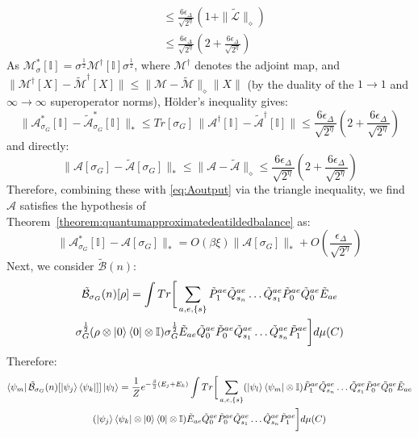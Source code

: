 \documentclass[aps,floatfix,10pt,amssymb,amsfont,amsmath,superscriptaddress,float,nofootinbib,longbibliography,nobalancelastpage,twocolumn]{revtex4-2}
\begin{document}
\begin{widetext}
\begin{align}
    &\leq \frac{6\epsilon_{\Delta}}{\sqrt{2^{\eta}}}(1+\|\tilde{\mathcal{L}}\|_{\diamond})\\
    &\leq \frac{6\epsilon_{\Delta}}{\sqrt{2^{\eta}}}(2+\frac{6\epsilon_{\Delta}}{\sqrt{2^{\eta}}})
\end{align}
As $\mathcal{M}^*_{\sigma}[\mathbb{I}] = \sigma^{\frac{1}{2}}\mathcal{M}^{\dagger}[\mathbb{I}]\sigma^{\frac{1}{2}}$, where $\mathcal{M}^{\dagger}$ denotes the adjoint map, and $\|\mathcal{M}^{\dagger}[X] - \tilde{\mathcal{M}}^{\dagger}[X]\| \leq \|\mathcal{M}-\tilde{\mathcal{M}}\|_{\diamond}\|X\|$ (by the duality of the $1\to1$ and $\infty\to\infty$ superoperator norms), H\"older's inequality gives:
\begin{equation}
    \|\mathcal{A}^*_{\sigma_G}[\mathbb{I}] - \tilde{\mathcal{A}}^*_{\sigma_G}[\mathbb{I}]\|_* \leq Tr[\sigma_G]\,\|\mathcal{A}^{\dagger}[\mathbb{I}] - \tilde{\mathcal{A}}^{\dagger}[\mathbb{I}]\| \leq \frac{6\epsilon_{\Delta}}{\sqrt{2^{\eta}}}(2+\frac{6\epsilon_{\Delta}}{\sqrt{2^{\eta}}})
\end{equation}
and directly:
\begin{equation}
    \|\mathcal{A}[\sigma_G] - \tilde{\mathcal{A}}[\sigma_G]\|_* \leq \|\mathcal{A}-\tilde{\mathcal{A}}\|_{\diamond} \leq \frac{6\epsilon_{\Delta}}{\sqrt{2^{\eta}}}(2+\frac{6\epsilon_{\Delta}}{\sqrt{2^{\eta}}})
\end{equation}
Therefore, combining these with \eqref{eq:Aoutput} via the triangle inequality, we find $\mathcal{A}$ satisfies the hypothesis of Theorem~\ref{theorem:quantumapproximatedeatildedbalance} as:
\begin{equation}
    \|\mathcal{A}^*_{\sigma_G}[\mathbb{I}] - \mathcal{A}[\sigma_G]\|_* = O(\beta\xi)\|\mathcal{A}[\sigma_G]\|_* + O\left(\frac{\epsilon_{\Delta}}{\sqrt{2^{\eta}}}\right)
\end{equation}
Next, we consider $\tilde{\mathcal{B}}(n)$:
\begin{multline}
    \tilde{\mathcal{B}}_{\sigma_G}(n)[\rho] = \int Tr\bigg[ \sum_{a,e,\{s\}}\tilde P^{ae}_1\tilde Q^{ae}_{s_n}\ldots \tilde Q^{ae}_{s_1}\tilde P^{ae}_0\tilde Q^{ae}_0\tilde E_{ae} \\\sigma_G^{\frac{1}{2}}(\rho\otimes \ket{0}\bra{0} \otimes \mathbb{I})\sigma_G^{\frac{1}{2}}  \tilde E_{ae}\tilde Q^{ae}_0\tilde P^{ae}_0\tilde Q^{ae}_{s_1}\ldots \tilde Q^{ae}_{s_n}\tilde P^{ae}_1\bigg]d\mu(C)
\end{multline}
Therefore:
\begin{multline}
    \bra{\psi_m}\tilde{\mathcal{B}}_{\sigma_G}(n)[\ket{\psi_j}\bra{\psi_k}]]\ket{\psi_l} = \frac{1}{Z}e^{-\frac{\beta}{2}(E_j+E_k)}\int Tr\bigg[ \sum_{a,e,\{s\}}(\ket{\psi_l}\bra{\psi_m}\otimes \mathbb{I})\tilde P^{ae}_1\tilde Q^{ae}_{s_n}\ldots \tilde Q^{ae}_{s_1}\tilde P^{ae}_0\tilde Q^{ae}_0\tilde E_{ae} \\(\ket{\psi_j}\bra{\psi_k}\otimes \ket{0}\bra{0}\otimes \mathbb{I})  \tilde E_{ae}\tilde Q^{ae}_0\tilde P^{ae}_0\tilde Q^{ae}_{s_1}\ldots \tilde Q^{ae}_{s_n}\tilde P^{ae}_1\bigg]d\mu(C)

\end{multline}
\end{widetext}
\end{document}
